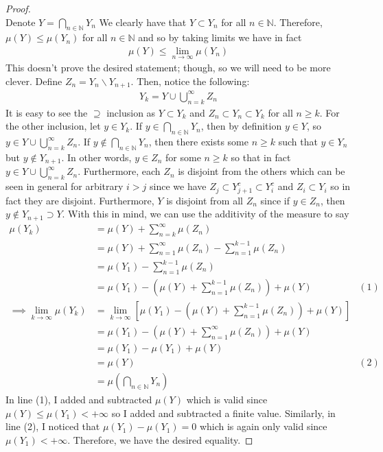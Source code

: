 \documentclass[10pt,a4paper]{article}
\theoremstyle{definition}
\theoremstyle{definition}
\numberwithin{equation}{section}
\begin{document}
\begin{proof}$ $
\\Denote $Y = \bigcap_{n \in \mathbb{N}} Y_n$ We clearly have that $Y \subset Y_n$ for all $n \in \mathbb{N}$. Therefore, $\mu(Y) \leq \mu(Y_n)$ for all $n \in \mathbb{N}$ and so by taking limits we have in fact 
\begin{align*}
\mu(Y) \leq \lim_{n \to \infty} \mu(Y_n)
\end{align*}
This doesn't prove the desired statement; though, so we will need to be more clever. Define $Z_n = Y_n \backslash Y_{n + 1}$. Then, notice the following:
\begin{align*}
Y_k = Y \cup \bigcup_{n = k}^\infty Z_n
\end{align*}
It is easy to see the $\supseteq$ inclusion as $Y \subset Y_k$ and $Z_n \subset Y_n \subset Y_k$ for all $n \geq k$. For the other inclusion, let $y \in Y_k$. If $y \in \bigcap_{n \in \mathbb{N}} Y_n$, then by definition $y \in Y$, so $y \in Y \cup \bigcup_{n = k}^\infty Z_n$. If $y \not \in \bigcap_{n \in \mathbb{N}} Y_n$, then there exists some $n \geq k$ such that $y \in Y_n$ but $y \not \in Y_{n+1}$. In other words, $y \in Z_n$ for some $n \geq k$ so that in fact $y \in Y \cup \bigcup_{n = k}^\infty Z_n$. Furthermore, each $Z_n$ is disjoint from the others which can be seen in general for arbitrary $i > j$ since we have $Z_j \subset Y_{j+1}^c \subset Y_i^c$ and $Z_i \subset Y_i$ so in fact they are disjoint. Furthermore, $Y$ is disjoint from all $Z_n$ since if $y \in Z_n$, then $y \not \in Y_{n+1} \supset Y$. With this in mind, we can use the additivity of the measure to say
\begin{align*}
\mu(Y_k) &= \mu(Y) + \sum_{n = k}^\infty \mu(Z_n)\\
&= \mu(Y) + \sum_{n = 1}^\infty \mu(Z_n) - \sum_{n = 1}^{k-1} \mu(Z_n)\\
&= \mu(Y_1) - \sum_{n = 1}^{k-1} \mu(Z_n)\\
&= \mu(Y_1) - \left( \mu(Y) + \sum_{n = 1}^{k-1} \mu(Z_n) \right) + \mu(Y) &(1)\\
\implies \lim_{k \to \infty} \mu(Y_k) &= \lim_{k \to \infty} \left[\mu(Y_1) - \left( \mu(Y) + \sum_{n = 1}^{k-1} \mu(Z_n) \right) + \mu(Y)\right]\\
&= \mu(Y_1) - \left( \mu(Y) + \sum_{n = 1}^{\infty} \mu(Z_n) \right) + \mu(Y)\\
&= \mu(Y_1) - \mu(Y_1) + \mu(Y)\\
&= \mu(Y) &(2)\\
&= \mu\left(\bigcap_{n \in \mathbb{N}} Y_n\right)
\end{align*}
In line (1), I added and subtracted $\mu(Y)$ which is valid since $\mu(Y) \leq \mu(Y_1) < +\infty$ so I added and subtracted a finite value. Similarly, in line (2), I noticed that $\mu(Y_1) - \mu(Y_1) = 0$ which is again only valid since $\mu(Y_1) < +\infty$. Therefore, we have the desired equality. 
\end{proof}
\end{document}
